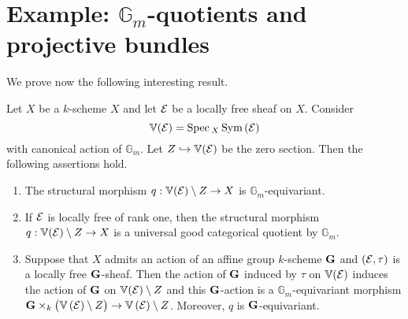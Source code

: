 \section{Example: $\mathbb{G}_m$-quotients and projective bundles}
\noindent
We prove now the following interesting result.

\begin{proposition}\label{proposition:}
Let $X$ be a $k$-scheme $X$ and let ${\mathcal E}$ be a locally free sheaf on $X$. Consider 
$$\mathbb{V}({\mathcal E}) = \mathrm{Spec}\,_X\,\textrm{Sym}\left({\mathcal E}\right)$$
with canonical action of $\mathbb{G}_m$. Let $Z\hookrightarrow \mathbb{V}({\mathcal E})$ be the zero section. Then the following assertions hold.
\begin{enumerate}[label=\emph{\textbf{(\arabic*)}}, leftmargin=3.0em]
\item The structural morphism $q:\mathbb{V}({\mathcal E})\setminus Z\rightarrow X$ is $\mathbb{G}_m$-equivariant.
\item If ${\mathcal E}$ is locally free of rank one, then the structural morphism $q:\mathbb{V}({\mathcal E})\setminus Z\rightarrow X$ is a universal good categorical quotient by $\mathbb{G}_m$.
\item Suppose that $X$ admits an action of an affine group $k$-scheme $\mathbf{G}$ and $({\mathcal E},\tau)$ is a locally free $\mathbf{G}$-sheaf. Then the action of $\mathbf{G}$ induced by $\tau$ on $\mathbb{V}({\mathcal E})$ induces the action of $\mathbf{G}$ on $\mathbb{V}({\mathcal E})\setminus Z$ and this $\mathbf{G}$-action is a $\mathbb{G}_m$-equivariant morphism $\mathbf{G}\times_k\big(\mathbb{V}\left({\mathcal E}\right)\setminus Z\big)\rightarrow \mathbb{V}\left({\mathcal E}\right)\setminus Z$. Moreover, $q$ is $\mathbf{G}$-equivariant.
\end{enumerate}
\end{proposition}

